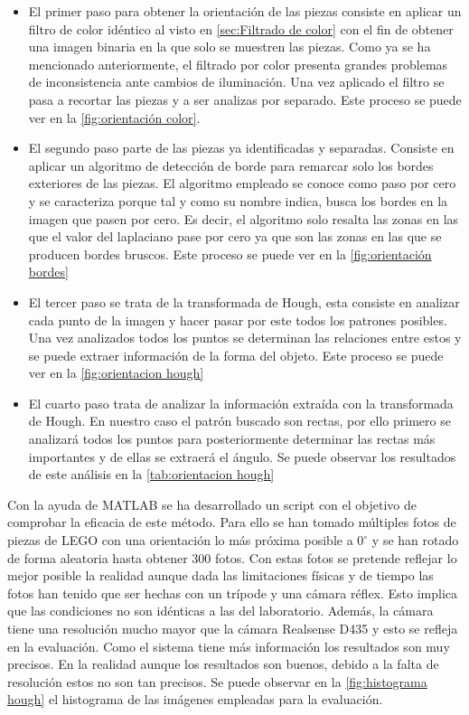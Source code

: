 \begin{itemize}
\item El primer paso para obtener la orientación de las piezas consiste en aplicar un filtro de color idéntico al visto en \autoref{sec:Filtrado de color} con el fin de obtener una imagen binaria en la que solo se muestren las piezas. Como ya se ha mencionado anteriormente, el filtrado por color presenta grandes problemas de inconsistencia ante cambios de iluminación. Una vez aplicado el filtro se pasa a recortar las piezas y a ser analizas por separado. Este proceso se puede ver en la \autoref{fig:orientación color}.

\item El segundo paso parte de las piezas ya identificadas y separadas. Consiste en aplicar un algoritmo de detección de borde para remarcar solo los bordes exteriores de las piezas. El algoritmo empleado se conoce como paso por cero y se caracteriza porque tal y como su nombre indica, busca los bordes en la imagen que pasen por cero. Es decir, el algoritmo solo resalta las zonas en las que el valor del laplaciano pase por cero ya que son las zonas en las que se producen bordes bruscos. Este proceso se puede ver en la \autoref{fig:orientación bordes}

\item El tercer paso se trata de la transformada de Hough, esta consiste en analizar cada punto de la imagen y hacer pasar por este todos los patrones posibles. Una vez analizados todos los puntos se determinan las relaciones entre estos y se puede extraer información de la forma del objeto.  Este proceso se puede ver en la \autoref{fig:orientacion hough}

\item El cuarto paso trata de analizar la información extraída con la transformada de Hough. En nuestro caso el patrón buscado son rectas, por ello primero se analizará todos los puntos para posteriormente determinar las rectas más importantes y de ellas se extraerá el ángulo. Se puede observar los resultados de este análisis en la \autoref{tab:orientacion hough}
\end{itemize}

Con la ayuda de MATLAB se ha desarrollado un script con el objetivo de comprobar la eficacia de este método. Para ello se han tomado múltiples fotos de piezas de LEGO con una orientación lo más próxima posible a $0^{\circ}$ y se han rotado de forma aleatoria hasta obtener 300 fotos. Con estas fotos se pretende reflejar lo mejor posible la realidad aunque dada las limitaciones físicas y de tiempo las fotos han tenido que ser hechas con un trípode y una cámara réflex. Esto implica que las condiciones no son idénticas a las del laboratorio. Además, la cámara tiene una resolución mucho mayor que la cámara Realsense D435 y esto se refleja en la evaluación. Como el sistema tiene más información los resultados son muy precisos. En la realidad aunque los resultados son buenos, debido a la falta de resolución estos no son tan precisos. Se puede observar en la \autoref{fig:histograma hough} el histograma de las imágenes empleadas para la evaluación.



